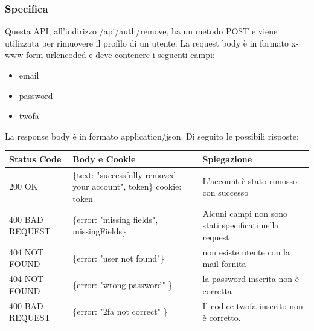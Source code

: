 \documentclass{report}
\begin{document}
\subsubsection*{Specifica}
Questa API, all'indirizzo /api/auth/remove, ha un metodo POST e viene utilizzata per rimuovere il profilo di un utente.
La request body è in formato x-www-form-urlencoded e deve contenere i seguenti campi:
\begin{itemize}
	\item email
	\item password
	\item twofa
\end{itemize}
La response body è in formato application/json. Di seguito le possibili risposte:
\begin{center} %
	\centering
	\begin{tabular}{ |p{4cm}|p{5cm}|p{4cm}| }
		\hline
		\centering Status Code & \qquad\quad Body e Cookie                                          & \qquad\qquad Spiegazione                              \\ %
		\hline
		200 OK                 & \{text: "successfully removed your account", token\} cookie: token & L'account è stato rimosso con successo                \\
		\hline
		400 BAD REQUEST        & \{error: "missing fields", missingFields\}                         & Alcuni campi non sono stati specificati nella request \\ %
		\hline
		404 NOT FOUND          & \{error: "user not found"\}                                        & non esiste utente con la mail fornita                 \\%
		\hline
		404 NOT FOUND          & \{error: "wrong password" \}                                       & la password inserita non è corretta                   \\
		\hline
		400 BAD REQUEST        & \{error: "2fa not correct" \}                                      & Il codice twofa inserito non è corretto.              \\
		\hline
	\end{tabular}
\end{center}
\end{document}
